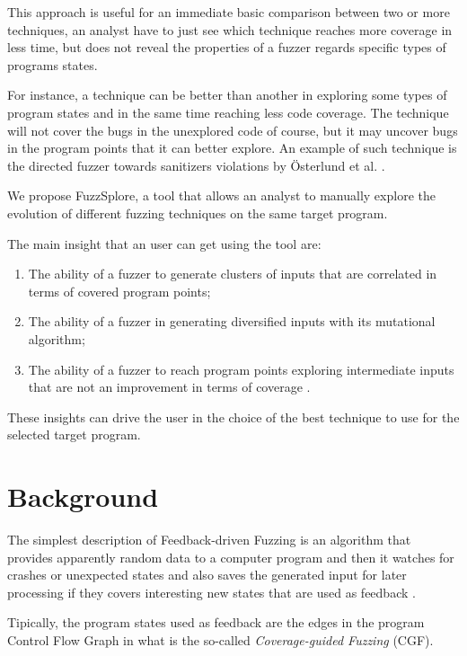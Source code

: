 \documentclass[conference,compsoc]{IEEEtran}
\begin{document}
This approach is useful for an immediate basic comparison between two or more techniques, an analyst have to just see which technique reaches more coverage in less time, but does not reveal the properties of a fuzzer regards specific types of programs states.

For instance, a technique can be better than another in exploring some types of program states and in the same time reaching less code coverage.
The technique will not cover the bugs in the unexplored code of course, but it may uncover bugs in the program points that it can better explore.
An example of such technique is the directed fuzzer towards sanitizers violations by \"Osterlund et al. \cite{parmesan}.

We propose {\sc FuzzSplore}, a tool that allows an analyst to manually explore the evolution of different fuzzing techniques on the same target program.

The main insight that an user can get using the tool are:

\begin{enumerate}
\item The ability of a fuzzer to generate clusters of inputs that are correlated in terms of covered program points;
\item The ability of a fuzzer in generating diversified inputs with its mutational algorithm;
\item The ability of a fuzzer to reach program points exploring intermediate inputs that are not an improvement in terms of coverage \cite{besensitive}.
\end{enumerate}

These insights can drive the user in the choice of the best technique to use for the selected target program.

\section{Background}

The simplest description of Feedback-driven Fuzzing is an algorithm that provides apparently random data to a computer program and then it watches for crashes or unexpected states and also saves the generated input for later processing if they covers interesting new states that are used as feedback \cite{fuzzing-book}.

Tipically, the program states used as feedback are the edges in the program Control Flow Graph \cite{compilerbook} in what is the so-called {\it Coverage-guided Fuzzing} (CGF).
\end{document}
